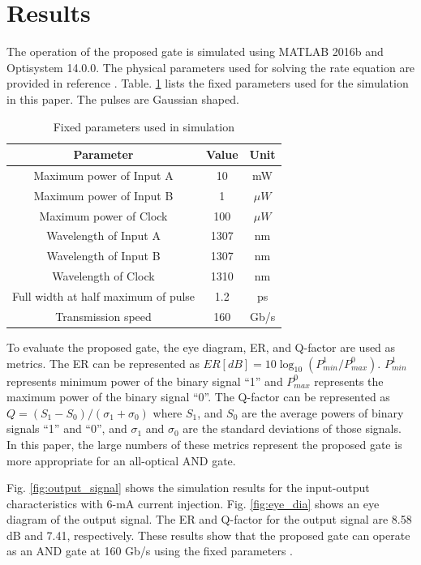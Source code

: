 \documentclass[twocolumn]{el-author}
\begin{document}
\section{Results}
The operation of the proposed gate is simulated using MATLAB 2016b and Optisystem 14.0.0. The physical parameters used for solving the rate equation are provided in reference {\cite{pcqdsoa}}. Table. {\ref{tb:param}} lists the fixed parameters used for the simulation in this paper. The pulses are Gaussian shaped. \par
\begin{table}[htbp]
\begin{center}
  \centering
  \caption{Fixed parameters used in simulation}
  \begin{tabular}{|c|c|c|} \hline
    Parameter & Value & Unit \\ \hline
    Maximum power of Input A & 10 & mW \\ \hline
    Maximum power of Input B & 1 & $\mu W$ \\ \hline
    Maximum power of Clock & 100 & $\mu W$ \\ \hline
    Wavelength of Input A & 1307 & nm \\ \hline
    Wavelength of Input B & 1307 & nm \\ \hline
    Wavelength of Clock & 1310 & nm \\ \hline
    Full width at half maximum of pulse & 1.2 & ps \\ \hline
    Transmission speed & 160 & Gb/s \\ \hline
  \end{tabular}
  \label{tb:param}
\end{center}
\end{table}
To evaluate the proposed gate, the eye diagram, ER, and Q-factor are used as metrics. The ER can be represented as $ER[dB] = 10\log_{10} \left(P^{1}_{min} / P^{0}_{max} \right)$. $P^{1}_{min}$ represents minimum power of the binary signal ``1'' and $P^{0}_{max}$ represents the maximum power of the binary signal ``0''. The Q-factor can be represented as $Q = (S_{1}-S_{0})/(\sigma_{1}+\sigma_{0}) ${\cite{q_factor}} where $S_{1}$, and $S_{0}$ are the average powers of binary signals ``1'' and ``0'', and $\sigma_{1}$ and $\sigma_{0}$ are the standard deviations of those signals. In this paper, the large numbers of these metrics represent the proposed gate is more appropriate for an all-optical AND gate. \par
Fig. {\ref{fig:output_signal}} shows the simulation results for the input-output characteristics with 6-mA current injection. Fig. {\ref{fig:eye_dia}} shows an eye diagram of the output signal. The ER and Q-factor for the output signal are 8.58 dB and 7.41, respectively. These results show that the proposed gate can operate as an AND gate at 160 Gb/s using the fixed parameters {\cite{extinction_ratio}}. \par
\end{document}
